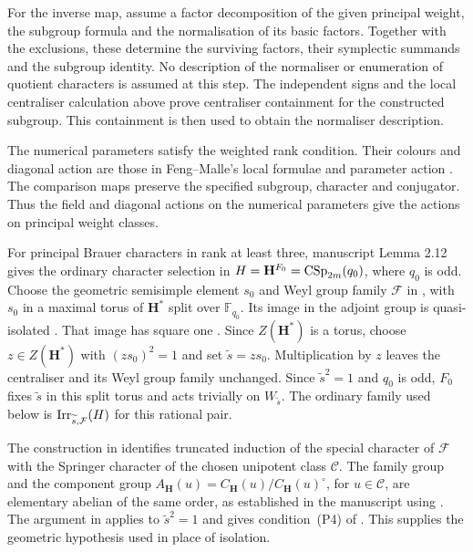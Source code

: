 For the inverse map, assume a factor decomposition of the given principal
weight, the subgroup formula and the normalisation of its basic factors.
Together with the exclusions, these determine the surviving factors, their
symplectic summands and the subgroup identity. No description of the
normaliser or enumeration of quotient characters is assumed at this step.
The independent signs and the local centraliser calculation above prove
centraliser containment for the constructed subgroup. This containment is
then used to obtain the normaliser description.

The numerical parameters satisfy the weighted rank condition. Their colours
and diagonal action are those in Feng--Malle's local formulae and parameter
action \cite[Lemma~5.1 and Proposition~5.9]{FengMalle2022}. The comparison
maps preserve the specified subgroup, character and conjugator. Thus the
field and diagonal actions on the numerical parameters give the actions on
principal weight classes.

For principal Brauer characters in rank at least three, manuscript
Lemma 2.12 gives the ordinary character selection in
$H=\mathbf H^{F_0}=\operatorname{CSp}_{2m}(q_0)$, where $q_0$ is odd.
Choose the geometric semisimple element $s_0$ and Weyl group family
$\mathcal F$ in \cite[10.1--10.3]{Taylor2014Maximal}, with $s_0$
in a maximal torus of $\mathbf H^*$ split over $\mathbb F_{q_0}$.
Its image in the adjoint group is quasi-isolated
\cite[6.19]{Taylor2014Maximal}. That image has square one
\cite[Proposition~4.11(a)]{Bonnafe2005}.
Since $Z(\mathbf H^*)$ is a torus, choose
$z\in Z(\mathbf H^*)$ with $(zs_0)^2=1$ and set $\widetilde s=zs_0$.
Multiplication by $z$ leaves the centraliser and its Weyl group family
unchanged. Since $\widetilde s^2=1$ and $q_0$ is odd, $F_0$ fixes
$\widetilde s$ in this split torus and acts trivially on $W_{\widetilde s}$.
The ordinary family used below is
$\operatorname{Irr}_{\widetilde s,\mathcal F}(H)$ for this rational pair.

The construction in \cite[Proposition~10.2]{Taylor2014Maximal}
identifies truncated induction of the special character of
$\mathcal F$ with the Springer character of the chosen unipotent
class $\mathcal C$. The family group and the component group
$A_{\mathbf H}(u)=C_{\mathbf H}(u)/C_{\mathbf H}(u)^\circ$, for
$u\in\mathcal C$, are elementary abelian of the same order, as
established in the manuscript using
\cite[7.1 and Proposition~10.2]{Taylor2014Maximal}.
The argument in \cite[7.4]{Taylor2014Maximal} applies to
$\widetilde s^2=1$ and gives condition~\textup{(P4)} of
\cite[Theorem~2.11]{Taylor2014Maximal}. This supplies the geometric
hypothesis \cite[(4.4)(b)]{Geck1999GGGR} used in place of isolation.

